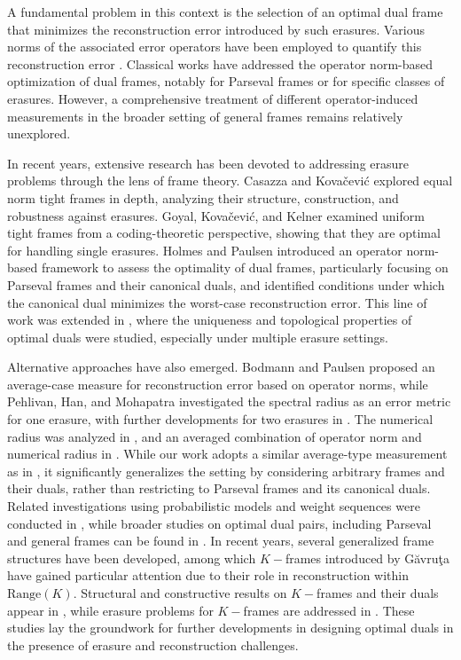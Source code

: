 \documentclass[final,1p,times]{elsarticle}
\begin{document}
A fundamental problem in this context is the selection of an optimal dual frame that minimizes the reconstruction error introduced by such erasures. Various norms of the associated error operators have been employed to quantify this reconstruction error \cite{peh, shan4, jerr, jins}. Classical works have addressed the operator norm-based optimization of dual frames, notably for Parseval frames or for specific classes of erasures\cite{holm}. However, a comprehensive treatment of different operator-induced measurements in the broader setting of general frames remains relatively unexplored.

In recent years, extensive research has been devoted to addressing erasure problems through the lens of frame theory. Casazza and Kovačević \cite{casa2} explored equal norm tight frames in depth, analyzing their structure, construction, and robustness against erasures. Goyal, Kovačević, and Kelner \cite{goya} examined uniform tight frames from a coding-theoretic perspective, showing that they are optimal for handling single erasures. Holmes and Paulsen \cite{holm} introduced an operator norm-based framework to assess the optimality of dual frames, particularly focusing on Parseval frames and their canonical duals, and identified conditions under which the canonical dual minimizes the worst-case reconstruction error. This line of work was extended in \cite{jerr, jins}, where the uniqueness and topological properties of optimal duals were studied, especially under multiple erasure settings.

Alternative approaches have also emerged. Bodmann and Paulsen \cite{bodm1} proposed an average-case measure for reconstruction error based on operator norms, while Pehlivan, Han, and Mohapatra \cite{sali} investigated the spectral radius as an error metric for one erasure, with further developments for two erasures in \cite{peh, dev}. The numerical radius was analyzed in \cite{ara}, and an averaged combination of operator norm and numerical radius in \cite{deep}. While our work adopts a similar average-type measurement as in \cite{bodm1}, it significantly generalizes the setting by considering arbitrary frames and their duals, rather than restricting to Parseval frames and its canonical duals. Related investigations using probabilistic models and weight sequences were conducted in \cite{leng3, li1}, while broader studies on optimal dual pairs, including Parseval and general frames can be found in \cite{leng, li, shan}. In recent years, several generalized frame structures have been developed, among which \(K-\)frames introduced by G\u{a}vru\c{t}a \cite{gua} have gained particular attention due to their role in reconstruction within \(\mathrm{Range}(K)\). Structural and constructive results on \(K-\)frames and their duals appear in \cite{du,he,li4,bar,wang,nami,li3,pill,xiao,koba}, while erasure problems for \(K-\)frames are addressed in \cite{miao,he}. These studies lay the groundwork for further developments in designing optimal duals in the presence of erasure and reconstruction challenges.
\end{document}
